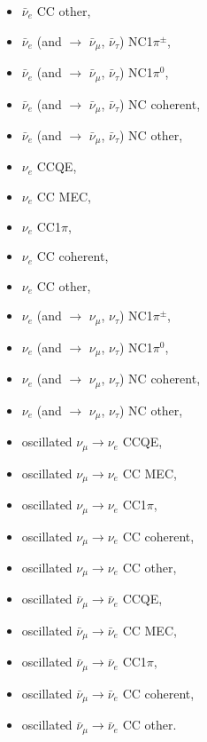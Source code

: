 \begin{itemize}
\item  $\bar{\nu}_{e}$ CC other,
\item  $\bar{\nu}_{e}$ (and $\rightarrow$ $\bar{\nu}_{\mu}$, $\bar{\nu}_{\tau}$) NC1$\pi^{\pm}$,
\item  $\bar{\nu}_{e}$ (and $\rightarrow$ $\bar{\nu}_{\mu}$, $\bar{\nu}_{\tau}$) NC1$\pi^{0}$,
\item  $\bar{\nu}_{e}$ (and $\rightarrow$ $\bar{\nu}_{\mu}$, $\bar{\nu}_{\tau}$) NC coherent,
\item  $\bar{\nu}_{e}$ (and $\rightarrow$ $\bar{\nu}_{\mu}$, $\bar{\nu}_{\tau}$) NC other,
\item  $\nu_{e}$ CCQE, 
\item  $\nu_{e}$ CC MEC,
\item  $\nu_{e}$ CC1$\pi$,
\item  $\nu_{e}$ CC coherent,
\item  $\nu_{e}$ CC other,
\item  $\nu_{e}$ (and $\rightarrow$ $\nu_{\mu}$, $\nu_{\tau}$) NC1$\pi^{\pm}$,
\item  $\nu_{e}$ (and $\rightarrow$ $\nu_{\mu}$, $\nu_{\tau}$) NC1$\pi^{0}$,
\item  $\nu_{e}$ (and $\rightarrow$ $\nu_{\mu}$, $\nu_{\tau}$) NC coherent,
\item  $\nu_{e}$ (and $\rightarrow$ $\nu_{\mu}$, $\nu_{\tau}$) NC other,
\item  oscillated $\nu_{\mu} \rightarrow \nu_{e}$ CCQE,
\item  oscillated $\nu_{\mu} \rightarrow \nu_{e}$ CC MEC,
\item  oscillated $\nu_{\mu} \rightarrow \nu_{e}$ CC1$\pi$,
\item  oscillated $\nu_{\mu} \rightarrow \nu_{e}$ CC coherent,
\item  oscillated $\nu_{\mu} \rightarrow \nu_{e}$ CC other,
\item  oscillated $\bar{\nu}_{\mu} \rightarrow \bar{\nu}_{e}$ CCQE,
\item  oscillated $\bar{\nu}_{\mu} \rightarrow \bar{\nu}_{e}$ CC MEC,
\item  oscillated $\bar{\nu}_{\mu} \rightarrow \bar{\nu}_{e}$ CC1$\pi$,
\item  oscillated $\bar{\nu}_{\mu} \rightarrow \bar{\nu}_{e}$ CC coherent,
\item  oscillated $\bar{\nu}_{\mu} \rightarrow \bar{\nu}_{e}$ CC other.

\end{itemize}
